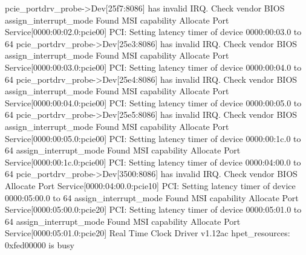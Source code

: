 \documentclass[mingoth,a4paper]{jsarticle}
\begin{document}
\begin{commandline}
pcie_portdrv_probe->Dev[25f7:8086] has invalid IRQ. Check vendor BIOS
assign_interrupt_mode Found MSI capability
Allocate Port Service[0000:00:02.0:pcie00]
PCI: Setting latency timer of device 0000:00:03.0 to 64
pcie_portdrv_probe->Dev[25e3:8086] has invalid IRQ. Check vendor BIOS
assign_interrupt_mode Found MSI capability
Allocate Port Service[0000:00:03.0:pcie00]
PCI: Setting latency timer of device 0000:00:04.0 to 64
pcie_portdrv_probe->Dev[25e4:8086] has invalid IRQ. Check vendor BIOS
assign_interrupt_mode Found MSI capability
Allocate Port Service[0000:00:04.0:pcie00]
PCI: Setting latency timer of device 0000:00:05.0 to 64
pcie_portdrv_probe->Dev[25e5:8086] has invalid IRQ. Check vendor BIOS
assign_interrupt_mode Found MSI capability
Allocate Port Service[0000:00:05.0:pcie00]
PCI: Setting latency timer of device 0000:00:1c.0 to 64
assign_interrupt_mode Found MSI capability
Allocate Port Service[0000:00:1c.0:pcie00]
PCI: Setting latency timer of device 0000:04:00.0 to 64
pcie_portdrv_probe->Dev[3500:8086] has invalid IRQ. Check vendor BIOS
Allocate Port Service[0000:04:00.0:pcie10]
PCI: Setting latency timer of device 0000:05:00.0 to 64
assign_interrupt_mode Found MSI capability
Allocate Port Service[0000:05:00.0:pcie20]
PCI: Setting latency timer of device 0000:05:01.0 to 64
assign_interrupt_mode Found MSI capability
Allocate Port Service[0000:05:01.0:pcie20]
Real Time Clock Driver v1.12ac
hpet_resources: 0xfed00000 is busy
\end{commandline}
\end{document}
